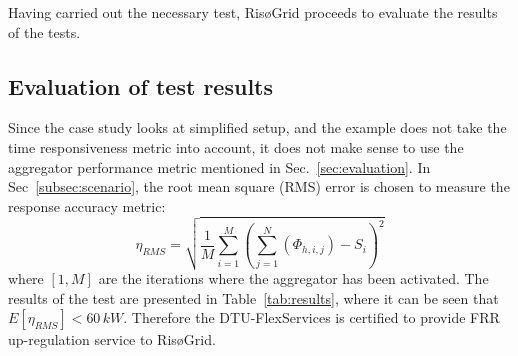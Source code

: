 Having carried out the necessary test, RisøGrid proceeds to evaluate the results of the tests.

\subsection{Evaluation of test results}
Since the case study looks at simplified setup, and the example does not take the time responsiveness metric into account, it does not make sense to use the aggregator performance metric mentioned in Sec.~\ref{sec:evaluation}. In Sec~\ref{subsec:scenario}, the root mean square (RMS) error is chosen to measure the response accuracy metric: 
\begin{equation}
  \eta_{RMS} = \sqrt{\frac{1}{M}\sum_{i=1}^M\left(\sum_{j=1}^N\left(\Phi_{h,i,j}\right) - S_i\right)^2}
\end{equation}
where $\left[1,M\right]$ are the iterations where the aggregator has been activated. The results of the test are presented in Table~\ref{tab:results}, where it can be seen that $E[\eta_{RMS}]<60 \, kW$. Therefore the DTU-FlexServices is certified to provide FRR up-regulation service to RisøGrid.

